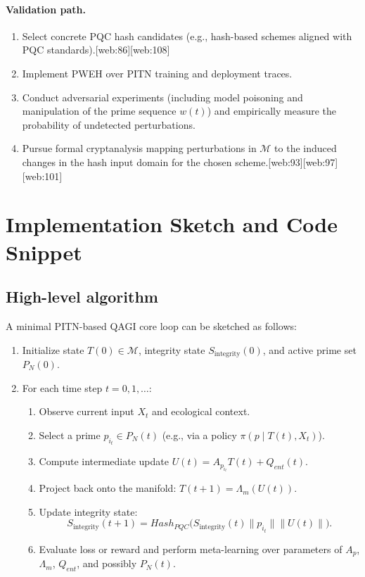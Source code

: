 \documentclass[11pt]{article}
\begin{document}
\paragraph{Validation path.}
\begin{enumerate}[leftmargin=*]
  \item Select concrete PQC hash candidates (e.g., hash-based schemes aligned with PQC standards).[web:86][web:108]
  \item Implement PWEH over PITN training and deployment traces.
  \item Conduct adversarial experiments (including model poisoning and manipulation of the prime sequence \( w(t) \)) and empirically measure the probability of undetected perturbations.
  \item Pursue formal cryptanalysis mapping perturbations in \( \mathcal{M} \) to the induced changes in the hash input domain for the chosen scheme.[web:93][web:97][web:101]
\end{enumerate}

\section{Implementation Sketch and Code Snippet}

\subsection{High-level algorithm}

A minimal PITN-based QAGI core loop can be sketched as follows:

\begin{enumerate}[leftmargin=*]
  \item Initialize state \( T(0) \in \mathcal{M} \), integrity state \( S_{\text{integrity}}(0) \), and active prime set \( P_N(0) \).
  \item For each time step \( t = 0,1,\dots \):
  \begin{enumerate}[label=(\alph*), leftmargin=2em]
    \item Observe current input \( X_t \) and ecological context.
    \item Select a prime \( p_{i_t} \in P_N(t) \) (e.g., via a policy \( \pi(p \mid T(t), X_t) \)).
    \item Compute intermediate update \( U(t) = A_{p_{i_t}} T(t) + Q_{ent}(t) \).
    \item Project back onto the manifold: \( T(t+1) = \Lambda_m(U(t)) \).
    \item Update integrity state:
    \[
    S_{\text{integrity}}(t+1)
    =
    Hash_{PQC}\big(S_{\text{integrity}}(t) \parallel p_{i_t} \parallel \|U(t)\|\big).
    \]
    \item Evaluate loss or reward and perform meta-learning over parameters of \( A_p \), \( \Lambda_m \), \( Q_{ent} \), and possibly \( P_N(t) \).
  \end{enumerate}
\end{enumerate}
\end{document}
